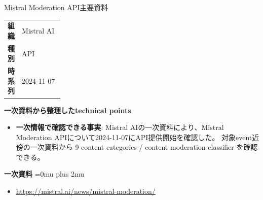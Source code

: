 \begin{technicalnote}{Mistral Moderation API}{主要資料}
\begingroup
\begin{tabularx}{\linewidth}{@{}>{\bfseries}p{0.22\linewidth}X@{}}
組織 & Mistral AI \\
種別 & API \\
時系列 & 2024-11-07 \\
\end{tabularx}
\smallskip
{\bfseries 一次資料から整理したtechnical points}
\begin{itemize}[leftmargin=1.5em,itemsep=0.35em]
\item \textbf{一次情報で確認できる事実}: Mistral AIの一次資料により、Mistral Moderation APIについて2024-11-07にAPI提供開始を確認した。 対象event近傍の一次資料から 9 content categories / content moderation classifier を確認できる。
\end{itemize}
\begin{minipage}{\linewidth}
\begin{samepage}
{\bfseries 一次資料}
\begingroup\sloppy
\Urlmuskip=0mu plus 2mu\relax
\begin{itemize}[leftmargin=1.5em,itemsep=0.25em]
\item {\scriptsize\url{https://mistral.ai/news/mistral-moderation/}}
\end{itemize}
\endgroup
\end{samepage}
\end{minipage}
\endgroup
\end{technicalnote}
\medskip

